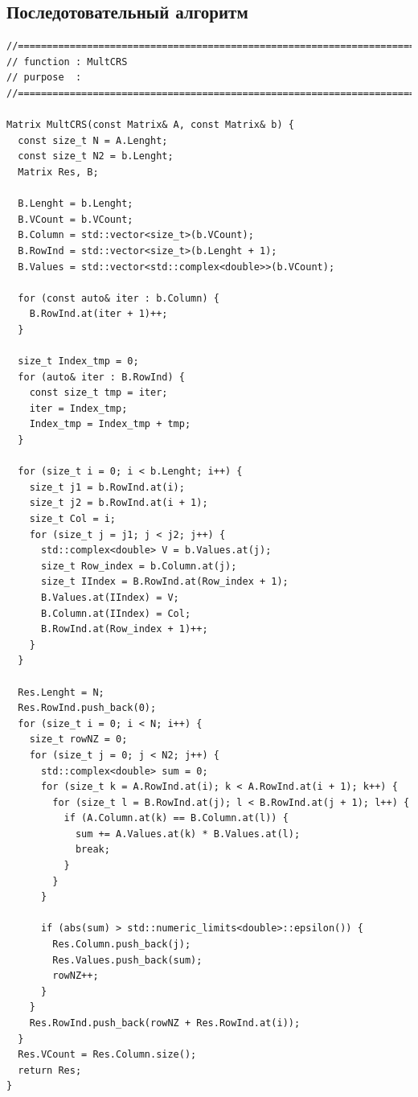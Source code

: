 \documentclass{report}
\begin{document}
\subsection*{Последотовательный алгоритм}
\begin{lstlisting}
//=======================================================================
// function : MultCRS
// purpose  :
//=======================================================================

Matrix MultCRS(const Matrix& A, const Matrix& b) {
  const size_t N = A.Lenght;
  const size_t N2 = b.Lenght;
  Matrix Res, B;

  B.Lenght = b.Lenght;
  B.VCount = b.VCount;
  B.Column = std::vector<size_t>(b.VCount);
  B.RowInd = std::vector<size_t>(b.Lenght + 1);
  B.Values = std::vector<std::complex<double>>(b.VCount);

  for (const auto& iter : b.Column) {
    B.RowInd.at(iter + 1)++;
  }

  size_t Index_tmp = 0;
  for (auto& iter : B.RowInd) {
    const size_t tmp = iter;
    iter = Index_tmp;
    Index_tmp = Index_tmp + tmp;
  }

  for (size_t i = 0; i < b.Lenght; i++) {
    size_t j1 = b.RowInd.at(i);
    size_t j2 = b.RowInd.at(i + 1);
    size_t Col = i;
    for (size_t j = j1; j < j2; j++) {
      std::complex<double> V = b.Values.at(j);
      size_t Row_index = b.Column.at(j);
      size_t IIndex = B.RowInd.at(Row_index + 1);
      B.Values.at(IIndex) = V;
      B.Column.at(IIndex) = Col;
      B.RowInd.at(Row_index + 1)++;
    }
  }

  Res.Lenght = N;
  Res.RowInd.push_back(0);
  for (size_t i = 0; i < N; i++) {
    size_t rowNZ = 0;
    for (size_t j = 0; j < N2; j++) {
      std::complex<double> sum = 0;
      for (size_t k = A.RowInd.at(i); k < A.RowInd.at(i + 1); k++) {
        for (size_t l = B.RowInd.at(j); l < B.RowInd.at(j + 1); l++) {
          if (A.Column.at(k) == B.Column.at(l)) {
            sum += A.Values.at(k) * B.Values.at(l);
            break;
          }
        }
      }

      if (abs(sum) > std::numeric_limits<double>::epsilon()) {
        Res.Column.push_back(j);
        Res.Values.push_back(sum);
        rowNZ++;
      }
    }
    Res.RowInd.push_back(rowNZ + Res.RowInd.at(i));
  }
  Res.VCount = Res.Column.size();
  return Res;
}
\end{lstlisting}
\newpage
\end{document}

